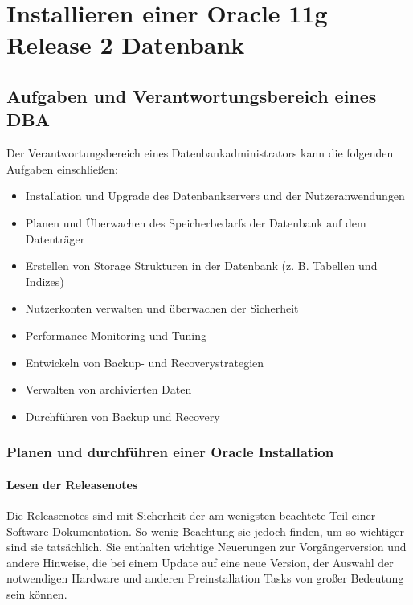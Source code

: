   \chapter{Installieren einer Oracle 11g Release 2 Datenbank}
    \setcounter{page}{1}
    \minitoc
\newpage
    \section{Aufgaben und Verantwortungsbereich eines DBA}
      Der Verantwortungsbereich eines Datenbankadministrators kann die folgenden Aufgaben einschlie\ss en:
      \begin{itemize}
        \item Installation und Upgrade des Datenbankservers und der Nutzeranwendungen
        \item Planen und \"Uberwachen des Speicherbedarfs der Datenbank auf dem Datentr\"ager
        \item Erstellen von Storage Strukturen in der Datenbank (z. B. Tabellen und Indizes)
        \item Nutzerkonten verwalten und \"uberwachen der Sicherheit
        \item Performance Monitoring und Tuning
        \item Entwickeln von Backup- und Recoverystrategien
        \item Verwalten von archivierten Daten
        \item Durchf\"uhren von Backup und Recovery
      \end{itemize}
      \subsection{Planen und durchf\"uhren einer Oracle Installation}
        \subsubsection{Lesen der Releasenotes}
          Die Releasenotes sind mit Sicherheit der am wenigsten beachtete Teil einer Software Dokumentation. So wenig Beachtung sie jedoch finden, um so wichtiger sind sie tats\"achlich. Sie enthalten wichtige Neuerungen zur Vorg\"angerversion und andere Hinweise, die bei einem Update auf eine neue Version, der Auswahl der notwendigen Hardware und anderen Preinstallation Tasks von gro\ss er Bedeutung sein k\"onnen.

          \begin{literaturinternet}
            \item \cite{e23557}
            \item \cite{e23558}
          \end{literaturinternet}

